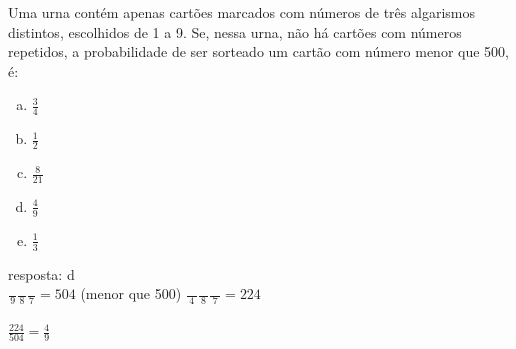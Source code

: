 \begin{ex}
 Uma urna contém apenas cartões marcados com números de três algarismos distintos, escolhidos de 1 a 9. Se, nessa urna, não há cartões com números repetidos, a probabilidade de ser sorteado um cartão com número menor que 500, é:
    \begin{enumerate}[(a)]
    \item $\frac{3}{4}$
    \item $\frac{1}{2}$
    \item $\frac{8}{21}$
    \item $\frac{4}{9}$
    \item $\frac{1}{3}$
    \end{enumerate}
    \begin{sol}
    resposta: d\\ 
 $\frac{\phantom{A}}{9}\frac{\phantom{A}}{8}\frac{\phantom{A}}{7}=504$\phantom{AA} (menor que 500)  $\frac{\phantom{10}}{4}\frac{\phantom{10}}{8}\frac{\phantom{10}}{7}= 224$\\ \\
 $\frac{224}{504}=\frac{4}{9}$

    \end{sol}
\end{ex}